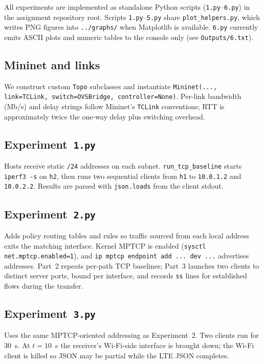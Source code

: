 \label{sec:implementation}

All experiments are implemented as standalone Python scripts (\texttt{1.py}--\texttt{6.py}) in the assignment repository root. Scripts \texttt{1.py}--\texttt{5.py} share \texttt{plot\_helpers.py}, which writes PNG figures into \texttt{../graphs/} when Matplotlib is available. \texttt{6.py} currently emits ASCII plots and numeric tables to the console only (see \texttt{Outputs/6.txt}).

\subsection{Mininet and links}
We construct custom \texttt{Topo} subclasses and instantiate \texttt{Mininet(..., link=TCLink, switch=OVSBridge, controller=None)}. Per-link bandwidth (Mb/s) and delay strings follow Mininet's \texttt{TCLink} conventions; RTT is approximately twice the one-way delay plus switching overhead.

\subsection{Experiment~\texttt{1.py}}
Hosts receive static \texttt{/24} addresses on each subnet. \texttt{run\_tcp\_baseline} starts \texttt{iperf3 -s} on \texttt{h2}, then runs two sequential clients from \texttt{h1} to \texttt{10.0.1.2} and \texttt{10.0.2.2}. Results are parsed with \texttt{json.loads} from the client stdout.

\subsection{Experiment~\texttt{2.py}}
Adds policy routing tables and rules so traffic sourced from each local address exits the matching interface. Kernel MPTCP is enabled (\texttt{sysctl net.mptcp.enabled=1}), and \texttt{ip mptcp endpoint add ... dev ...} advertises addresses. Part~2 repeats per-path TCP baselines; Part~3 launches two clients to distinct server ports, bound per interface, and records \texttt{ss} lines for established flows during the transfer.

\subsection{Experiment~\texttt{3.py}}
Uses the same MPTCP-oriented addressing as Experiment~2. Two clients run for $30$~s. At $t=10$~s the receiver's Wi-Fi-side interface is brought down; the Wi-Fi client is killed so JSON may be partial while the LTE JSON completes.


